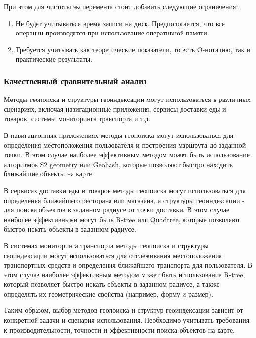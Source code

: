 При этом для чистоты эксперемента стоит добавить следующие ограничения:
\begin{enumerate}
    \item Не будет учитываться время записи на диск. Предпологается, что все операции производятся при использование оперативной памяти.
    \item Требуется учитывать как теоретические показатели, то есть O-нотацию, так и практические результаты.
\end{enumerate}

\subsubsection{Качественный сравнительный анализ}
Методы геопоиска и структуры геоиндексации могут использоваться в различных сценариях, включая навигационные приложения, сервисы доставки еды и товаров, системы мониторинга транспорта и т.д.

В навигационных приложениях методы геопоиска могут использоваться для определения местоположения пользователя и построения маршрута до заданной точки. В этом случае наиболее эффективным методом может быть использование алгоритмов S2 geometry или Geohash, которые позволяют быстро находить ближайшие объекты на карте.

В сервисах доставки еды и товаров методы геопоиска могут использоваться для определения ближайшего ресторана или магазина, а структуры геоиндексации - для поиска объектов в заданном радиусе от точки доставки. В этом случае наиболее эффективными могут быть R-tree или Quadtree, которые позволяют быстро искать объекты в заданном радиусе.

В системах мониторинга транспорта методы геопоиска и структуры геоиндексации могут использоваться для отслеживания местоположения транспортных средств и определения ближайшего транспорта для пользователя. В этом случае наиболее эффективным методом может быть использование R-tree, который позволяет быстро искать объекты в заданном радиусе, а также определять их геометрические свойства (например, форму и размер).

Таким образом, выбор методов геопоиска и структур геоиндексации зависит от конкретной задачи и сценария использования. Необходимо учитывать требования к производительности, точности и эффективности поиска объектов на карте.

